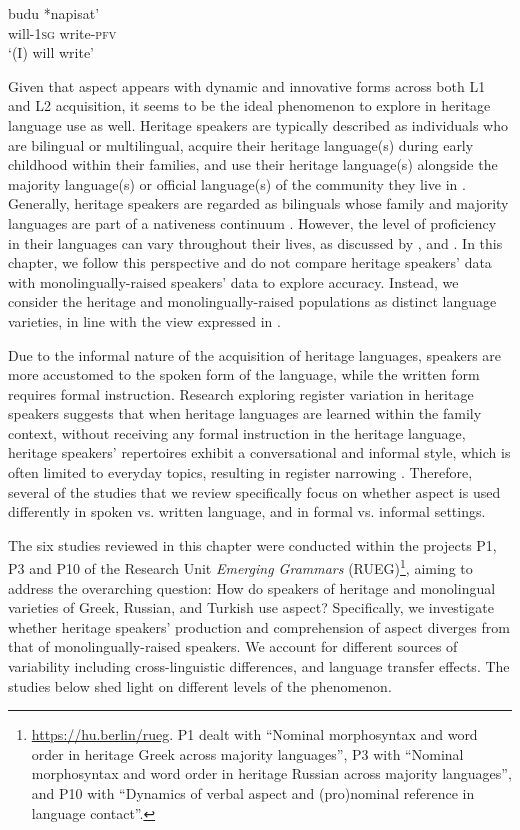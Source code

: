 \documentclass[output=paper,colorlinks,citecolor=brown]{langscibook}
\begin{document}
\ea  \label{Iwillwrite}
\gll budu *napisat'\\
	will-\textsc{1sg} \hphantom{*}write-\textsc{pfv}\\
\glt `(I) will write' 
\z 
{}

Given that aspect appears with dynamic and innovative forms across both L1 and L2 acquisition, it seems to be the ideal phenomenon to explore in heritage language use as well. Heritage speakers are typically described as individuals who are bilingual or multilingual, acquire their heritage language(s) during early childhood within their families, and use their heritage language(s) alongside the majority language(s) or official language(s) of the community they live in \parencite{Valdes2005, Rothman2009, benmamoun2013heritage, Guijarro-FuentesSchmitz2015, Montrul2015, Polinsky2015, polinsky2018heritage}.
Generally, heritage speakers are regarded as bilinguals whose family and majority languages are part of a nativeness continuum \parencite{wiese2022heritage}. 
However, the level of proficiency in their languages can vary throughout their lives, as discussed by \textcite{benmamoun2013heritage, polinsky2018heritage}, and \textcite{wiese2020language}. 
In this chapter, we follow this perspective and do not compare heritage speakers' data with monolingually-raised speakers' data to explore accuracy. 
Instead, we consider the heritage and monolingually-raised populations as distinct language varieties, in line with the view expressed in \textcite{rothman2023monolingual}.

Due to the informal nature of the acquisition of heritage languages, speakers are more accustomed to the spoken form of the language, while the written form requires formal instruction.
Research exploring register variation in heritage speakers suggests that when heritage languages are learned within the family context, without receiving any formal instruction in the heritage language, heritage speakers' repertoires exhibit a conversational and informal style, which is often limited to everyday topics, resulting in register narrowing \parencite{dressler1991sociolinguistic, chevalier2004heritage}. Therefore, several of the studies that we review specifically focus on whether aspect is used differently in spoken vs. written language, and in formal vs. informal settings.

The six studies reviewed in this chapter were conducted within the projects P1, P3 and P10 of the Research Unit \textit{Emerging Grammars} (RUEG)\footnote{\url{https://hu.berlin/rueg}. P1 dealt with “Nominal morphosyntax and word order in heritage Greek across majority languages”, P3 with “Nominal morphosyntax and word order in heritage Russian across majority languages”, and P10 with “Dynamics of verbal aspect and (pro)nominal reference in language contact”.}, aiming to address the overarching question: How do speakers of heritage and monolingual varieties of Greek, Russian, and Turkish use aspect? Specifically, we investigate whether heritage speakers' production and comprehension of aspect diverges from that of monolingually-raised speakers. We account for different sources of variability including cross-linguistic differences, and language transfer effects. The studies below shed light on different levels of the phenomenon. 
\end{document}
